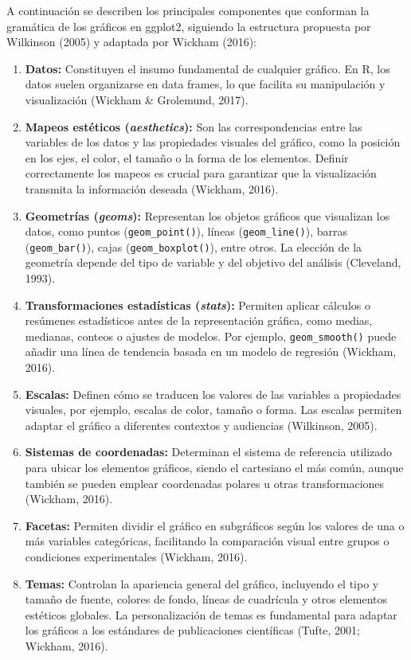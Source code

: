 \documentclass[
  spanish,
  a4paper,
  DIV=11,
  numbers=noendperiod,
  onepage,
  openany]{scrreprt}
\begin{document}
A continuación se describen los principales componentes que conforman la
gramática de los gráficos en ggplot2, siguiendo la estructura propuesta
por Wilkinson (2005) y adaptada por Wickham (2016):

\begin{enumerate}
\def\labelenumi{\arabic{enumi}.}
\item
  \textbf{Datos:} Constituyen el insumo fundamental de cualquier
  gráfico. En R, los datos suelen organizarse en data frames, lo que
  facilita su manipulación y visualización (Wickham \& Grolemund, 2017).
\item
  \textbf{Mapeos estéticos (\emph{aesthetics}):} Son las
  correspondencias entre las variables de los datos y las propiedades
  visuales del gráfico, como la posición en los ejes, el color, el
  tamaño o la forma de los elementos. Definir correctamente los mapeos
  es crucial para garantizar que la visualización transmita la
  información deseada (Wickham, 2016).
\item
  \textbf{Geometrías (\emph{geoms}):} Representan los objetos gráficos
  que visualizan los datos, como puntos (\texttt{geom\_point()}), líneas
  (\texttt{geom\_line()}), barras (\texttt{geom\_bar()}), cajas
  (\texttt{geom\_boxplot()}), entre otros. La elección de la geometría
  depende del tipo de variable y del objetivo del análisis (Cleveland,
  1993).
\item
  \textbf{Transformaciones estadísticas (\emph{stats}):} Permiten
  aplicar cálculos o resúmenes estadísticos antes de la representación
  gráfica, como medias, medianas, conteos o ajustes de modelos. Por
  ejemplo, \texttt{geom\_smooth()} puede añadir una línea de tendencia
  basada en un modelo de regresión (Wickham, 2016).
\item
  \textbf{Escalas:} Definen cómo se traducen los valores de las
  variables a propiedades visuales, por ejemplo, escalas de color,
  tamaño o forma. Las escalas permiten adaptar el gráfico a diferentes
  contextos y audiencias (Wilkinson, 2005).
\item
  \textbf{Sistemas de coordenadas:} Determinan el sistema de referencia
  utilizado para ubicar los elementos gráficos, siendo el cartesiano el
  más común, aunque también se pueden emplear coordenadas polares u
  otras transformaciones (Wickham, 2016).
\item
  \textbf{Facetas:} Permiten dividir el gráfico en subgráficos según los
  valores de una o más variables categóricas, facilitando la comparación
  visual entre grupos o condiciones experimentales (Wickham, 2016).
\item
  \textbf{Temas:} Controlan la apariencia general del gráfico,
  incluyendo el tipo y tamaño de fuente, colores de fondo, líneas de
  cuadrícula y otros elementos estéticos globales. La personalización de
  temas es fundamental para adaptar los gráficos a los estándares de
  publicaciones científicas (Tufte, 2001; Wickham, 2016).
\end{enumerate}
\end{document}
